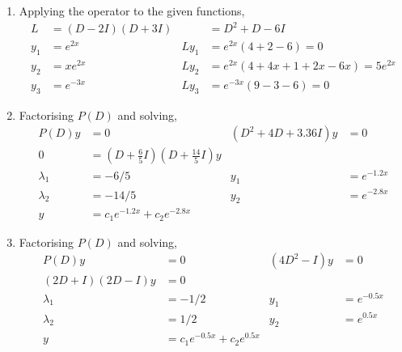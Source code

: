 \begin{enumerate}
    \item Applying the operator to the given functions,
          \begin{align}
              L     & = (D - 2I)(D + 3I) &        & = D^{2} + D - 6I                         \\
              y_{1} & = e^{2x}           & Ly_{1} & = e^{2x} (4 + 2 - 6) = 0                 \\
              y_{2} & = xe^{2x}          & Ly_{2} & = e^{2x}(4 + 4x + 1 + 2x - 6x) = 5e^{2x} \\
              y_{3} & = e^{-3x}          & Ly_{3} & = e^{-3x}(9 - 3 - 6) = 0
          \end{align}

    \item Factorising $ P(D) $ and solving,
          \begin{align}
              P(D)y       & = 0                                                                & (D^{2} + 4D + 3.36I)y & = 0         \\
              0           & = \left( D + \frac{6}{5}I \right)\left( D + \frac{14}{5}I \right)y                                       \\
              \lambda_{1} & = -6/5                                                             & y_{1}                 & = e^{-1.2x} \\
              \lambda_{2} & = -14/5                                                            & y_{2}                 & = e^{-2.8x} \\
              y           & = c_{1}e^{-1.2x} + c_{2}e^{-2.8x}
          \end{align}

    \item Factorising $ P(D) $ and solving,
          \begin{align}
              P(D)y                                       & = 0                              & (4D^{2} - I)y & = 0         \\
              \left( 2D + I \right)\left( 2D - I \right)y & = 0                                                            \\
              \lambda_{1}                                 & = -1/2                           & y_{1}         & = e^{-0.5x} \\
              \lambda_{2}                                 & = 1/2                            & y_{2}         & = e^{0.5x}  \\
              y                                           & = c_{1}e^{-0.5x} + c_{2}e^{0.5x}
          \end{align}


\end{enumerate}
